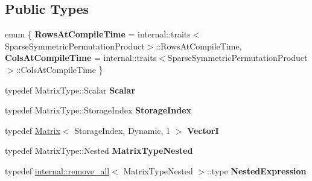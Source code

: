\subsection*{Public Types}
\begin{DoxyCompactItemize}
\item 
\mbox{\label{class_eigen_1_1_sparse_symmetric_permutation_product_a539e54e45a5256c09f68781ee60adcae}} 
enum \{ {\bfseries Rows\+At\+Compile\+Time} = internal\+::traits$<$Sparse\+Symmetric\+Permutation\+Product$>$\+::Rows\+At\+Compile\+Time, 
{\bfseries Cols\+At\+Compile\+Time} = internal\+::traits$<$Sparse\+Symmetric\+Permutation\+Product$>$\+::Cols\+At\+Compile\+Time
 \}
\item 
\mbox{\label{class_eigen_1_1_sparse_symmetric_permutation_product_a3c747f700e8423db88fef150c2a282ec}} 
typedef Matrix\+Type\+::\+Scalar {\bfseries Scalar}
\item 
\mbox{\label{class_eigen_1_1_sparse_symmetric_permutation_product_a1d2ee3395263f4c835ee4296368ac731}} 
typedef Matrix\+Type\+::\+Storage\+Index {\bfseries Storage\+Index}
\item 
\mbox{\label{class_eigen_1_1_sparse_symmetric_permutation_product_a1d2d670e84b37851b9568ceae8f981ed}} 
typedef \mbox{\hyperlink{class_eigen_1_1_matrix}{Matrix}}$<$ Storage\+Index, Dynamic, 1 $>$ {\bfseries VectorI}
\item 
\mbox{\label{class_eigen_1_1_sparse_symmetric_permutation_product_a099934ac338e7299e4e61e4ddedf42e8}} 
typedef Matrix\+Type\+::\+Nested {\bfseries Matrix\+Type\+Nested}
\item 
\mbox{\label{class_eigen_1_1_sparse_symmetric_permutation_product_af9780ec2cd4a63ace8e83c3128ac71bf}} 
typedef \mbox{\hyperlink{struct_eigen_1_1internal_1_1remove__all}{internal\+::remove\+\_\+all}}$<$ Matrix\+Type\+Nested $>$\+::type {\bfseries Nested\+Expression}
\end{DoxyCompactItemize}
